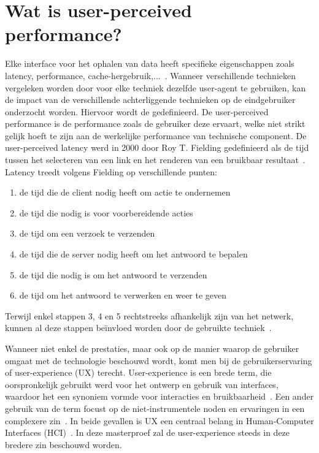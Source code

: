 \section{Wat is user-perceived performance?}
\label{sec:what_is_user_perceived_performance}
Elke interface voor het ophalen van data heeft specifieke eigenschappen zoals latency, performance, cache-hergebruik,...~\citep{verborgh16}. Wanneer verschillende technieken vergeleken worden door voor elke techniek dezelfde user-agent te gebruiken, kan de impact van de verschillende achterliggende technieken op de eindgebruiker onderzocht worden. Hiervoor wordt de  gedefinieerd. De user-perceived performance is de performance zoals de gebruiker deze ervaart, welke niet strikt gelijk hoeft te zijn aan de werkelijke performance van technische component. De user-perceived latency werd in 2000 door Roy T. Fielding gedefinieerd als de tijd tussen het selecteren van een link en het renderen van een bruikbaar resultaat~\citep{fielding99}. Latency treedt volgens Fielding op verschillende punten: 
\begin{enumerate}
	\item de tijd die de client nodig heeft om actie te ondernemen 
	\item de tijd die nodig is voor voorbereidende acties
	\item de tijd om een verzoek te verzenden
	\item de tijd die de server nodig heeft om het antwoord te bepalen
	\item de tijd die nodig is om het antwoord te verzenden
	\item de tijd om het antwoord te verwerken en weer te geven
\end{enumerate}
Terwijl enkel stappen 3, 4 en 5 rechtstreeks afhankelijk zijn van het netwerk, kunnen al deze stappen beïnvloed worden door de gebruikte techniek~\citep{fielding99}.

Wanneer niet enkel de prestaties, maar ook op de manier waarop de gebruiker omgaat met de technologie beschouwd wordt, komt men bij de gebruikerservaring of user-experience (UX) terecht. User-experience is een brede term, die oorspronkelijk gebruikt werd voor het ontwerp en gebruik van interfaces, waardoor het een synoniem vormde voor interacties en bruikbaarheid~\citep{avila11}. Een ander gebruik van de term focust op de niet-instrumentele noden en ervaringen in een complexere zin~\citep{avila11}. In beide gevallen is UX een centraal belang in Human-Computer Interfaces (HCI)~\citep{NíChonchúir2008}. In deze masterproef zal de user-experience steeds in deze bredere zin beschouwd worden. 


